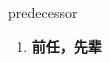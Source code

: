 
\begin{frame}
{\huge predecessor}
\begin{center}
\begin{enumerate}\Large
  \item \textbf{前任，先辈}
\end{enumerate}
\end{center}
\end{frame}
